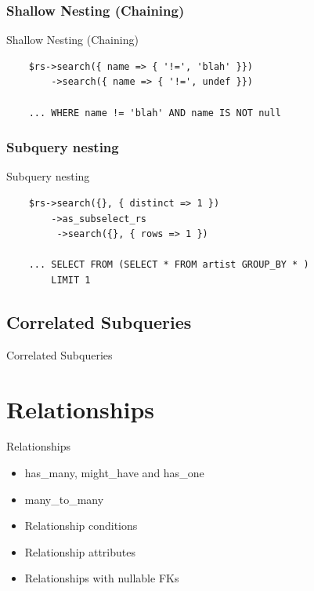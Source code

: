 
\subsubsection{Shallow Nesting (Chaining)}

\begin{frame}[fragile]{Shallow Nesting (Chaining)}
\begin{lstlisting}
    $rs->search({ name => { '!=', 'blah' }})
        ->search({ name => { '!=', undef }})

    ... WHERE name != 'blah' AND name IS NOT null
\end{lstlisting}
\end{frame}

\subsubsection{Subquery nesting}

\begin{frame}[fragile]{Subquery nesting}
\begin{lstlisting}
    $rs->search({}, { distinct => 1 })
        ->as_subselect_rs
         ->search({}, { rows => 1 })

    ... SELECT FROM (SELECT * FROM artist GROUP_BY * )
        LIMIT 1
\end{lstlisting}
\end{frame}

\subsection{Correlated Subqueries}
\begin{frame}{Correlated Subqueries}
\end{frame}

\section{Relationships}

\begin{frame}{Relationships}
\begin{itemize}
\item has\_many, might\_have and has\_one
\item many\_to\_many
\item Relationship conditions
\item Relationship attributes
\item Relationships with nullable FKs
\end{itemize}
\end{frame}

